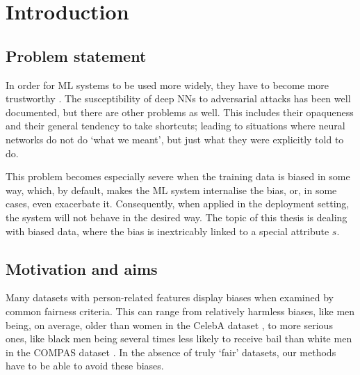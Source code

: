 \chapter{Introduction}\label{ch:introduction}
\section{Problem statement}
In order for \ac{ML} systems to be used more widely,
they have to become more trustworthy \citep{hleg2019ethics}.
The susceptibility of deep \acp{NN} to adversarial attacks has been well documented, but there are other problems as well.
This includes their opaqueness and their general tendency to take shortcuts;
leading to situations where neural networks do not do `what we meant', but just what they were explicitly told to do.

This problem becomes especially severe when the training data is biased in some way,
which, by default, makes the \ac{ML} system internalise the bias, or, in some cases, even exacerbate it.
Consequently, when applied in the deployment setting, the system will not behave in the desired way.
The topic of this thesis is dealing with biased data,
where the bias is inextricably linked to a special attribute $s$.

\section{Motivation and aims}
Many datasets with person-related features display biases when examined by common fairness criteria.
This can range from relatively harmless biases,
like men being, on average, older than women in the CelebA dataset \citep{liu2015faceattributes},
to more serious ones,
like black men being several times less likely to receive bail than white men in the COMPAS dataset \citep{angwin2016machine}.
In the absence of truly `fair' datasets, our methods have to be able to avoid these biases.


